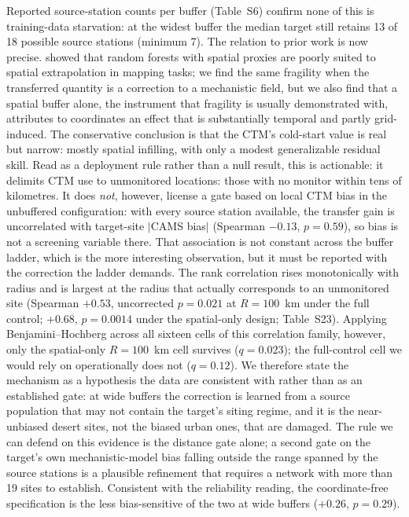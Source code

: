 \documentclass[review,times,authoryear]{elsarticle}
\begin{document}
Reported source-station counts per buffer (Table~S6) confirm none of this is training-data starvation: at the widest buffer the median target still retains 13 of 18 possible source stations (minimum 7). The relation to prior work is now precise. \citet{mila2024proxies} showed that random forests with spatial proxies are poorly suited to spatial extrapolation in mapping tasks; we find the same fragility when the transferred quantity is a correction to a mechanistic field, but we also find that a spatial buffer alone, the instrument that fragility is usually demonstrated with, attributes to coordinates an effect that is substantially temporal and partly grid-induced. The conservative conclusion is that the CTM's cold-start value is real but narrow: mostly spatial infilling, with only a modest generalizable residual skill. Read as a deployment rule rather than a null result, this is actionable: it delimits CTM use to unmonitored locations: those with no monitor within tens of kilometres. It does \emph{not}, however, license a gate based on local CTM bias in the unbuffered configuration: with every source station available, the transfer gain is uncorrelated with target-site $|$CAMS bias$|$ (Spearman $-0.13$, $p=0.59$), so bias is not a screening variable there. That association is not constant across the buffer ladder, which is the more interesting observation, but it must be reported with the correction the ladder demands. The rank correlation rises monotonically with radius and is largest at the radius that actually corresponds to an unmonitored site (Spearman $+0.53$, uncorrected $p=0.021$ at $R=100$~km under the full control; $+0.68$, $p=0.0014$ under the spatial-only design; Table~S23). Applying Benjamini--Hochberg across all sixteen cells of this correlation family, however, only the spatial-only $R=100$~km cell survives ($q=0.023$); the full-control cell we would rely on operationally does not ($q=0.12$). We therefore state the mechanism as a hypothesis the data are consistent with rather than as an established gate: at wide buffers the correction is learned from a source population that may not contain the target's siting regime, and it is the near-unbiased desert sites, not the biased urban ones, that are damaged. The rule we can defend on this evidence is the distance gate alone; a second gate on the target's own mechanistic-model bias falling outside the range spanned by the source stations is a plausible refinement that requires a network with more than 19 sites to establish. Consistent with the reliability reading, the coordinate-free specification is the less bias-sensitive of the two at wide buffers ($+0.26$, $p=0.29$).
\end{document}
